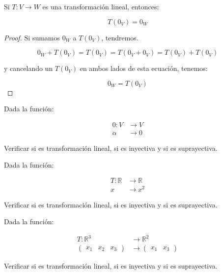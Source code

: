		\begin{proposicion}
			Si $T \colon V \to W$ es una transformación lineal, entonces:

			\begin{equation}
				T(0_V) = 0_W
			\end{equation}
		\end{proposicion}

		\begin{proof}
			Si sumamos $0_W$ a $T(0_V)$, tendremos.

			\begin{equation*}
				0_W + T(0_V) = T(0_V) = T(0_V + 0_V) = T(0_V) + T(0_V)
			\end{equation*}

			y cancelando un $T(0_V)$ en ambos lados de esta ecuación, tenemos:

			\begin{equation*}
				0_W = T(0_V)
			\end{equation*}
		\end{proof}

		\begin{ejercicio}
			Dada la función:

			\begin{align*}
				0 \colon V &\to V \\
				\alpha &\to 0
			\end{align*}

			Verificar si es transformación lineal, si es inyectiva y si es suprayectiva.
		\end{ejercicio}

		\begin{ejercicio}
			Dada la función:

			\begin{align*}
				T \colon \mathbb{R} &\to \mathbb{R} \\
				x &\to x^2
			\end{align*}

			Verificar si es transformación lineal, si es inyectiva y si es suprayectiva.
		\end{ejercicio}

		\begin{ejercicio}
			Dada la función:

			\begin{align*}
				T \colon \mathbb{R}^3 &\to \mathbb{R}^2 \\
				\begin{pmatrix} x_1 & x_2 & x_3 \end{pmatrix} &\to \begin{pmatrix} x_1 & x_3 \end{pmatrix}
			\end{align*}

			Verificar si es transformación lineal, si es inyectiva y si es suprayectiva.
		\end{ejercicio}


